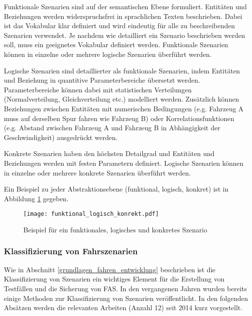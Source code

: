 Funktionale Szenarien sind auf der semantischen Ebene formuliert. Entitäten und Beziehungen werden widerspruchsfrei in sprachlichen Texten beschrieben. Dabei ist das Vokabular klar definiert und wird eindeutig für alle zu beschreibenden Szenarien verwendet. Je nachdem wie detailliert ein Szenario beschrieben werden soll, muss ein geeignetes Vokabular definiert werden. Funktionale Szenarien können in einzelne oder mehrere logische Szenarien überführt werden.

Logische Szenarien sind detaillierter als funktionale Szenarien, indem  Entitäten und Beziehung in quantitive Parameterbereiche übersetzt werden. Parameterbereiche können dabei mit statistischen Verteilungen (Normalverteilung, Gleichverteilung etc.) modelliert werden. Zusätzlich können Beziehungen zwischen Entitäten mit numerischen Bedingungen (e.g. Fahrzeug A muss auf derselben Spur fahren wie Fahrzeug B) oder Korrelationsfunktionen (e.g. Abstand zwischen Fahrzeug A und Fahrzeug B in Abhängigkeit der Geschwindigkeit) ausgedrückt werden.

Konkrete Szenarien haben den höchsten Detailgrad und Entitäten und Beziehungen werden mit festen Parametern definiert. Logische Szenarien können in einzelne oder mehrere konkrete Szenarien überführt werden.

Ein Beispiel zu jeder Abstraktionsebene (funktional, logisch, konkret) ist in Abbildung \ref{fig_funktional_logisch_konrekt} gegeben.

\begin{figure}[h]
\centering
\texttt{[image: funktional\_logisch\_konrekt.pdf]}
\caption{Beispiel für ein funktionales, logisches und konkretes Szenario \cite{bagschik2017szenarien}}
\label{fig_funktional_logisch_konrekt}
\end{figure}


\subsubsection{Klassifizierung von Fahrszenarien}

Wie in Abschnitt \ref{grundlagen_fahren_entwicklung} beschrieben ist die Klassifizierung von Szenarien ein wichtiges Element für die Erstellung von Testfällen und die Sicherung von \ac{FAS}. In den vergangenen Jahren wurden bereits einige Methoden zur Klassifizierung von Szenarien veröffentlicht. In den folgenden Absätzen werden die relevanten Arbeiten (Anzahl 12) seit 2014 kurz vorgestellt.

